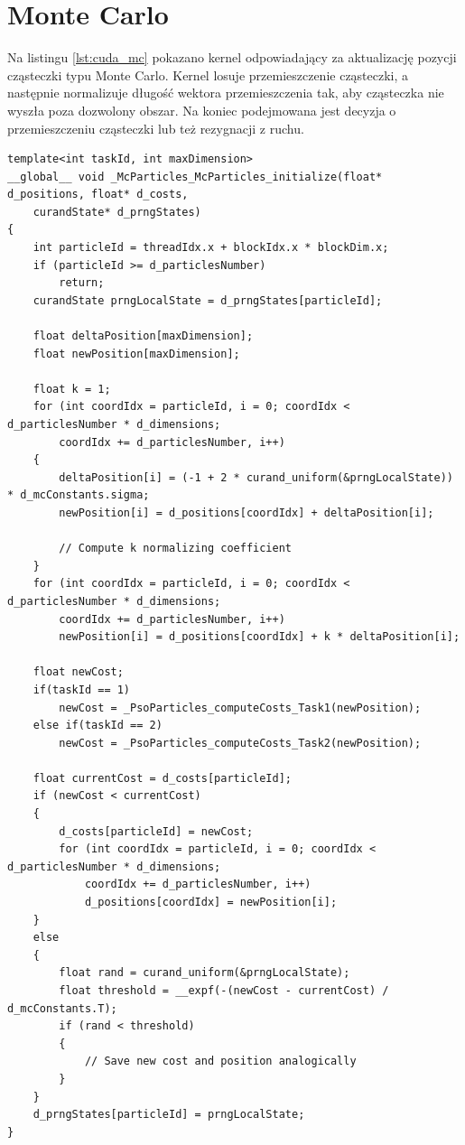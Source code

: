 \documentclass[11pt, a4paper, oneside]{article}
\begin{document}
\section{Monte Carlo}
Na listingu \ref{lst:cuda_mc} pokazano kernel odpowiadający za aktualizację pozycji cząsteczki typu Monte Carlo. Kernel losuje przemieszczenie cząsteczki, a następnie normalizuje długość wektora przemieszczenia tak, aby cząsteczka nie wyszła poza dozwolony obszar. Na koniec podejmowana jest decyzja o przemieszczeniu cząsteczki lub też rezygnacji z ruchu.

\begin{lstlisting}[style=mycpp, label=lst:cuda_mc, caption={Kernel CUDA aktualizujący cząsteczkę Monte Carlo.}]
template<int taskId, int maxDimension>
__global__ void _McParticles_McParticles_initialize(float* d_positions, float* d_costs,
	curandState* d_prngStates)
{
	int particleId = threadIdx.x + blockIdx.x * blockDim.x;
	if (particleId >= d_particlesNumber)
		return;
	curandState prngLocalState = d_prngStates[particleId];

	float deltaPosition[maxDimension];
	float newPosition[maxDimension];

	float k = 1;
	for (int coordIdx = particleId, i = 0; coordIdx < d_particlesNumber * d_dimensions;
		coordIdx += d_particlesNumber, i++)
	{
		deltaPosition[i] = (-1 + 2 * curand_uniform(&prngLocalState)) * d_mcConstants.sigma;
		newPosition[i] = d_positions[coordIdx] + deltaPosition[i];

		// Compute k normalizing coefficient
	}
	for (int coordIdx = particleId, i = 0; coordIdx < d_particlesNumber * d_dimensions;
		coordIdx += d_particlesNumber, i++)
		newPosition[i] = d_positions[coordIdx] + k * deltaPosition[i];

	float newCost;
	if(taskId == 1)
		newCost = _PsoParticles_computeCosts_Task1(newPosition);
	else if(taskId == 2)
		newCost = _PsoParticles_computeCosts_Task2(newPosition);

	float currentCost = d_costs[particleId];
	if (newCost < currentCost)
	{
		d_costs[particleId] = newCost;
		for (int coordIdx = particleId, i = 0; coordIdx < d_particlesNumber * d_dimensions;
			coordIdx += d_particlesNumber, i++)
			d_positions[coordIdx] = newPosition[i];
	}
	else
	{
		float rand = curand_uniform(&prngLocalState);
		float threshold = __expf(-(newCost - currentCost) / d_mcConstants.T);
		if (rand < threshold)
		{
			// Save new cost and position analogically
		}
	}
	d_prngStates[particleId] = prngLocalState;
}
\end{lstlisting}
\end{document}
